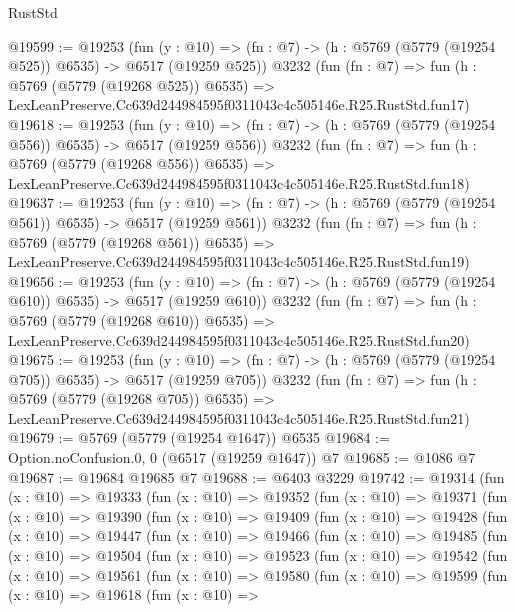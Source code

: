 \begin{lexlean}{RustStd}
\begin{coremodule}
@19599 := @19253
    (fun (y : @10) => (fn : @7) -> (h : @5769 (@5779 (@19254 @525)) @6535) -> @6517 (@19259 @525))
    @3232
    (fun (fn : @7) =>
    fun (h : @5769 (@5779 (@19268 @525)) @6535) =>
    LexLeanPreserve.Cc639d244984595f0311043c4c505146e.R25.RustStd.fun17)
@19618 := @19253
    (fun (y : @10) => (fn : @7) -> (h : @5769 (@5779 (@19254 @556)) @6535) -> @6517 (@19259 @556))
    @3232
    (fun (fn : @7) =>
    fun (h : @5769 (@5779 (@19268 @556)) @6535) =>
    LexLeanPreserve.Cc639d244984595f0311043c4c505146e.R25.RustStd.fun18)
@19637 := @19253
    (fun (y : @10) => (fn : @7) -> (h : @5769 (@5779 (@19254 @561)) @6535) -> @6517 (@19259 @561))
    @3232
    (fun (fn : @7) =>
    fun (h : @5769 (@5779 (@19268 @561)) @6535) =>
    LexLeanPreserve.Cc639d244984595f0311043c4c505146e.R25.RustStd.fun19)
@19656 := @19253
    (fun (y : @10) => (fn : @7) -> (h : @5769 (@5779 (@19254 @610)) @6535) -> @6517 (@19259 @610))
    @3232
    (fun (fn : @7) =>
    fun (h : @5769 (@5779 (@19268 @610)) @6535) =>
    LexLeanPreserve.Cc639d244984595f0311043c4c505146e.R25.RustStd.fun20)
@19675 := @19253
    (fun (y : @10) => (fn : @7) -> (h : @5769 (@5779 (@19254 @705)) @6535) -> @6517 (@19259 @705))
    @3232
    (fun (fn : @7) =>
    fun (h : @5769 (@5779 (@19268 @705)) @6535) =>
    LexLeanPreserve.Cc639d244984595f0311043c4c505146e.R25.RustStd.fun21)
@19679 := @5769 (@5779 (@19254 @1647)) @6535
@19684 := Option.noConfusion.{0, 0} (@6517 (@19259 @1647)) @7
@19685 := @1086 @7
@19687 := @19684 @19685 @7
@19688 := @6403 @3229
@19742 := @19314
    (fun (x : @10) =>
    @19333
      (fun (x : @10) =>
      @19352
        (fun (x : @10) =>
        @19371
          (fun (x : @10) =>
          @19390
            (fun (x : @10) =>
            @19409
              (fun (x : @10) =>
              @19428
                (fun (x : @10) =>
                @19447
                  (fun (x : @10) =>
                  @19466
                    (fun (x : @10) =>
                    @19485
                      (fun (x : @10) =>
                      @19504
                        (fun (x : @10) =>
                        @19523
                          (fun (x : @10) =>
                          @19542
                            (fun (x : @10) =>
                            @19561
                              (fun (x : @10) =>
                              @19580
                                (fun (x : @10) =>
                                @19599
                                  (fun (x : @10) =>
                                  @19618
                                    (fun (x : @10) =>

\end{coremodule}
\end{lexlean}
